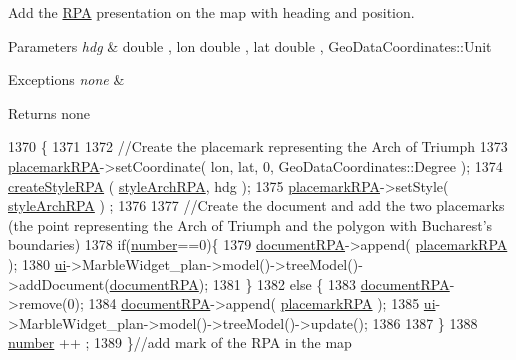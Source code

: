 Add the \hyperlink{a00012}{R\-P\-A} presentation on the map with heading and position. 


\begin{DoxyParams}{Parameters}
{\em hdg} & double , lon double , lat double , Geo\-Data\-Coordinates\-::\-Unit \\
\hline
\end{DoxyParams}

\begin{DoxyExceptions}{Exceptions}
{\em none} & \\
\hline
\end{DoxyExceptions}
\begin{DoxyReturn}{Returns}
none 
\end{DoxyReturn}

\begin{DoxyCode}
1370                                                                                    \{
1371 
1372     \textcolor{comment}{//Create the placemark representing the Arch of Triumph}
1373     \hyperlink{a00008_a5023376f47e503f88c7ee3bb2c096bb1}{placemarkRPA}->setCoordinate( lon, lat, 0, GeoDataCoordinates::Degree );
1374     \hyperlink{a00008_aa4eac90b52f2016336a952d8b2e4f7a1}{createStyleRPA} (  \hyperlink{a00008_a3ccaefd3393a3447a3a10d94ab67b0f9}{styleArchRPA}, hdg );
1375     \hyperlink{a00008_a5023376f47e503f88c7ee3bb2c096bb1}{placemarkRPA}->setStyle( \hyperlink{a00008_a3ccaefd3393a3447a3a10d94ab67b0f9}{styleArchRPA} ) ;
1376 
1377      \textcolor{comment}{//Create the document and add the two placemarks (the point representing the Arch of Triumph and the
       polygon with Bucharest's boundaries)}
1378      \textcolor{keywordflow}{if}(\hyperlink{a00008_a7106e2abc437ad981830d14176d15f09}{number}==0)\{
1379          \hyperlink{a00008_ab48a9573e6326f95a2bd888734fa7827}{documentRPA}->append( \hyperlink{a00008_a5023376f47e503f88c7ee3bb2c096bb1}{placemarkRPA} );
1380        \hyperlink{a00008_a6dc041ef6a2ffb329928d2913e8344e6}{ui}->MarbleWidget\_plan->model()->treeModel()->addDocument(\hyperlink{a00008_ab48a9573e6326f95a2bd888734fa7827}{documentRPA});
1381               \}
1382      \textcolor{keywordflow}{else} \{
1383          \hyperlink{a00008_ab48a9573e6326f95a2bd888734fa7827}{documentRPA}->remove(0);
1384          \hyperlink{a00008_ab48a9573e6326f95a2bd888734fa7827}{documentRPA}->append( \hyperlink{a00008_a5023376f47e503f88c7ee3bb2c096bb1}{placemarkRPA} );
1385          \hyperlink{a00008_a6dc041ef6a2ffb329928d2913e8344e6}{ui}->MarbleWidget\_plan->model()->treeModel()->update();
1386 
1387      \}
1388    \hyperlink{a00008_a7106e2abc437ad981830d14176d15f09}{number} ++ ;
1389 \}\textcolor{comment}{//add mark of the RPA in the map}
\end{DoxyCode}
